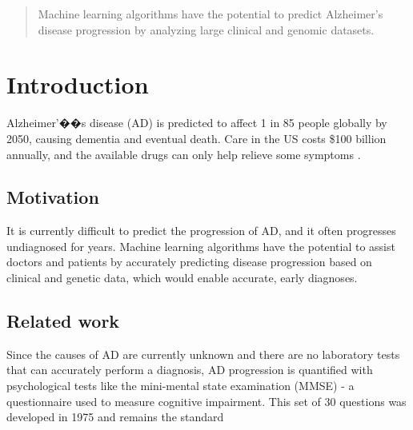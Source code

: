 \documentclass{article}
\begin{document}
 


\begin{abstract} 
Machine learning algorithms have the potential to predict Alzheimer's disease progression by analyzing large clinical and genomic datasets. 


\end{abstract} 



\section{Introduction}
Alzheimer'��s disease (AD) is predicted to affect 1 in 85 people globally by 2050, causing dementia and eventual death. Care in the US costs \$100 billion annually, and the available drugs can only help relieve some symptoms \cite{duthey13}.

\subsection{Motivation}
It is currently difficult to predict the progression of AD, and it often progresses undiagnosed for years. Machine learning algorithms have the potential to assist doctors and patients by accurately predicting disease progression based on clinical and genetic data, which would enable accurate, early diagnoses.

\subsection{Related work} Since the causes of AD are currently unknown and there are no laboratory tests that can accurately perform a diagnosis, AD progression is quantified with psychological tests like the mini-mental state examination (MMSE) - a questionnaire used to measure cognitive impairment. This set of 30 questions was developed in 1975 and remains the standard \cite{carolan07}
\end{document}
